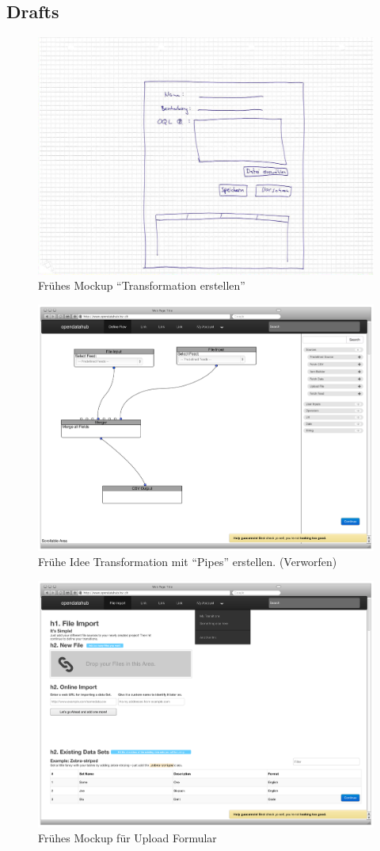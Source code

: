 \subsection{Drafts}
\begin{figure}[H]
    \centering
    \includegraphics[width=0.6\linewidth]{fig/mockup_hcdi}
    \caption{Frühes Mockup ``Transformation erstellen''}
    \label{fig:pd:mockup-upload}
\end{figure}
\begin{figure}[H]
    \centering
    \includegraphics[width=0.8\linewidth]{fig/Wireframes-Connectors}
    \caption{Frühe Idee Transformation mit ``Pipes'' erstellen. (Verworfen)}
    \label{fig:pd:connectors}
\end{figure}
\begin{figure}[H]
    \centering
    \includegraphics[width=0.8\linewidth]{fig/Wireframes-Upload}
    \caption{Frühes Mockup für Upload Formular}
    \label{fig:pd:wireframe-upload}
\end{figure}